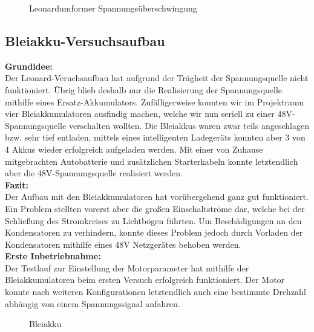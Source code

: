 \begin{figure}[H]
	\begin{center}
		\caption{Leonardumformer Spannungsüberschwingung}
	\end{center}
\end{figure}

\newpage

\subsection{Bleiakku-Versuchsaufbau}

\textbf{Grundidee:}
\\[2mm]
Der Leonard-Veruchsaufbau hat aufgrund der Trägheit der Spannungsquelle nicht funktioniert. Übrig blieb deshalb nur die Realisierung der Spannungsquelle mithilfe eines Ersatz-Akkumulators. Zufälligerweise konnten wir im Projektraum vier Bleiakkumulatoren ausfindig machen, welche wir nun seriell zu einer 48V-Spannungsquelle verschalten wollten. Die Bleiakkus waren zwar teils angeschlagen bzw. sehr tief entladen, mittels eines intelligenten Ladegeräts konnten aber 3 von 4 Akkus wieder erfolgreich aufgeladen werden. Mit einer von Zuhause mitgebrachten Autobatterie und zusätzlichen Starterkabeln konnte letztendlich aber die 48V-Spannungsquelle realisiert werden.
\\[5mm]

\textbf{Fazit:}
\\[2mm]
Der Aufbau mit den Bleiakkumulatoren hat vorübergehend ganz gut funktioniert. Ein Problem stellten vorerst aber die großen Einschaltströme dar, welche bei der Schließung des Stromkreises zu Lichtbögen führten. Um Beschädigungen an den Kondensatoren zu verhindern, konnte dieses Problem jedoch durch Vorladen der Kondensatoren mithilfe eines 48V Netzgerätes behoben werden.
\\[5mm]

\textbf{Erste Inbetriebnahme:}
\\[2mm]
Der Testlauf zur Einstellung der Motorparameter hat mithilfe der Bleiakkumulatoren beim ersten Versuch erfolgreich funktioniert. Der Motor konnte nach weiteren Konfigurationen letztendlich auch eine bestimmte Drehzahl abhängig von einem Spannungssignal anfahren. 


\begin{figure}[H]
	\begin{center}
		\caption{Bleiakku}
	\end{center}
\end{figure}

\newpage

